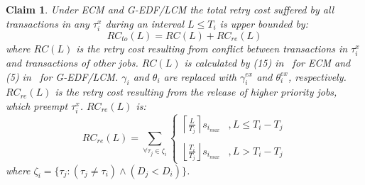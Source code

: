 \documentclass[a4paper,english]{article}
\newtheorem{clm}{Claim}
\begin{document}
\begin{clm}\label{ecm rlease conflict}
Under ECM and G-EDF/LCM the total retry cost suffered by all transactions in any $\tau_i^x$ during an interval $L\le T_i$ is upper bounded by:
\begin{equation}
RC_{to}(L)=RC(L)+RC_{re}(L)
\label{total rc ecm eq}
\end{equation}
where $RC(L)$ is the retry cost resulting from conflict between transactions in $\tau_i^x$ and transactions of other jobs. $RC(L)$ is calculated by (15) in~\cite{stmconcurrencycontrol:emsoft11} for ECM and (5) in~\cite{lcmdac2012} for G-EDF/LCM. $\gamma_i$ and $\theta_i$ are replaced with $\gamma_i^{ex}$ and $\theta_i^{ex}$, respectively. $RC_{re}(L)$ is the retry cost resulting from the release of higher priority jobs, which preempt $\tau_i^x$. $RC_{re}(L)$ is:
\begin{equation}
RC_{re}(L)=\sum_{\forall \tau_{j}\in\zeta_{i}}\begin{cases}
\left\lceil \frac{L}{T_{j}}\right\rceil s_{i_{max}} & ,L\le T_{i}-T_{j}\\\\
\left\lfloor \frac{T_{i}}{T_{j}}\right\rfloor s_{i_{max}} & ,L>T_{i}-T_{j}
\end{cases}\label{eq6}
\end{equation}
%
where $\zeta_i=\{\tau_j:\left(\tau_j \ne \tau_i\right)\wedge \left(D_j < D_i \right)\}$.
\end{clm}
\end{document}
